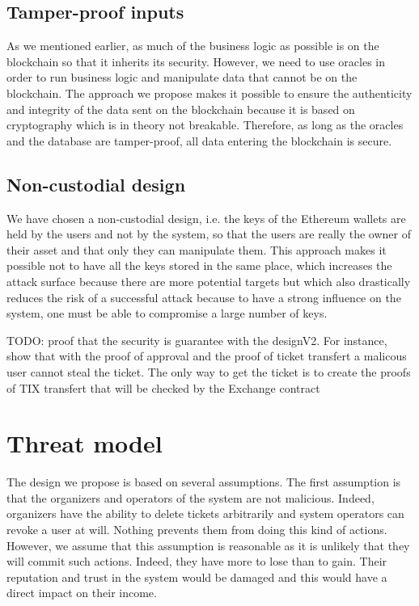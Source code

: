 \documentclass[a4paper,11pt,oneside]{report}
\begin{document}
\subsection{Tamper-proof inputs}
As we mentioned earlier, as much of the business logic as possible is on the blockchain so that it inherits its security. However, we need to use oracles in order to run business logic and manipulate data that cannot be on the blockchain. The approach we propose makes it possible to ensure the authenticity and integrity of the data sent on the blockchain because it is based on cryptography which is in theory not breakable. Therefore, as long as the oracles and the database are tamper-proof, all data entering the blockchain is secure.

\subsection{Non-custodial design}
We have chosen a non-custodial design, i.e. the keys of the Ethereum wallets are held by the users and not by the system, so that the users are really the owner of their asset and that only they can manipulate them. This approach makes it possible not to have all the keys stored in the same place, which increases the attack surface because there are more potential targets but which also drastically reduces the risk of a successful attack because to have a strong influence on the system, one must be able to compromise a large number of keys.

TODO: proof that the security is guarantee with the designV2. For instance, show that with the proof of approval and the proof of ticket transfert a malicous user cannot steal the ticket. The only way to get the ticket is to create the proofs of TIX transfert that will be checked by the Exchange contract

\section{Threat model}
The design we propose is based on several assumptions. The first assumption is that the organizers and operators of the system are not malicious. Indeed, organizers have the ability to delete tickets arbitrarily and system operators can revoke a user at will. Nothing prevents them from doing this kind of actions. However, we assume that this assumption is reasonable as it is unlikely that they will commit such actions. Indeed, they have more to lose than to gain. Their reputation and trust in the system would be damaged and this would have a direct impact on their income.
\end{document}
